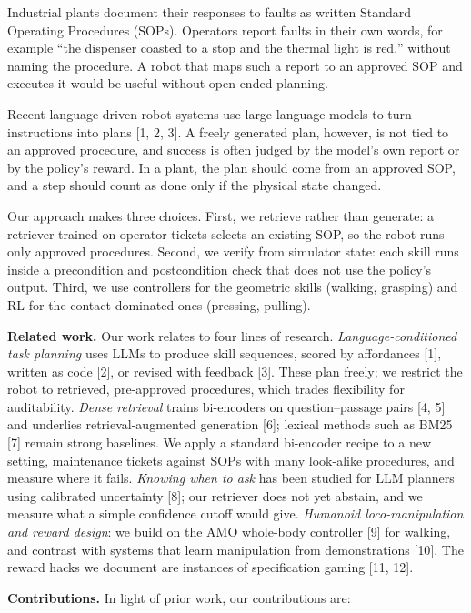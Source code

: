 \documentclass[
  10pt,
  twocolumn]{article}
\begin{document}
Industrial plants document their responses to faults as written Standard
Operating Procedures (SOPs). Operators report faults in their own words,
for example ``the dispenser coasted to a stop and the thermal light is
red,'' without naming the procedure. A robot that maps such a report to
an approved SOP and executes it would be useful without open-ended
planning.

Recent language-driven robot systems use large language models to turn
instructions into plans {[}1, 2, 3{]}. A freely generated plan, however,
is not tied to an approved procedure, and success is often judged by the
model's own report or by the policy's reward. In a plant, the plan
should come from an approved SOP, and a step should count as done only
if the physical state changed.

Our approach makes three choices. First, we retrieve rather than
generate: a retriever trained on operator tickets selects an existing
SOP, so the robot runs only approved procedures. Second, we verify from
simulator state: each skill runs inside a precondition and postcondition
check that does not use the policy's output. Third, we use controllers
for the geometric skills (walking, grasping) and RL for the
contact-dominated ones (pressing, pulling).

\textbf{Related work.} Our work relates to four lines of research.
\emph{Language-conditioned task planning} uses LLMs to produce skill
sequences, scored by affordances {[}1{]}, written as code {[}2{]}, or
revised with feedback {[}3{]}. These plan freely; we restrict the robot
to retrieved, pre-approved procedures, which trades flexibility for
auditability. \emph{Dense retrieval} trains bi-encoders on
question--passage pairs {[}4, 5{]} and underlies retrieval-augmented
generation {[}6{]}; lexical methods such as BM25 {[}7{]} remain strong
baselines. We apply a standard bi-encoder recipe to a new setting,
maintenance tickets against SOPs with many look-alike procedures, and
measure where it fails. \emph{Knowing when to ask} has been studied for
LLM planners using calibrated uncertainty {[}8{]}; our retriever does
not yet abstain, and we measure what a simple confidence cutoff would
give. \emph{Humanoid loco-manipulation and reward design}: we build on
the AMO whole-body controller {[}9{]} for walking, and contrast with
systems that learn manipulation from demonstrations {[}10{]}. The reward
hacks we document are instances of specification gaming {[}11, 12{]}.

\textbf{Contributions.} In light of prior work, our contributions are:
\end{document}
